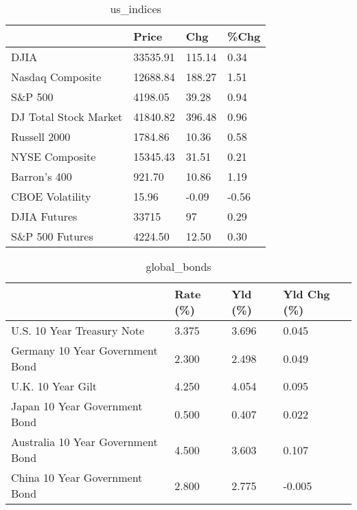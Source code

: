 \documentclass{article}%
\begin{document}
%


\begin{table}[htbp]%
\caption{us\_indices}%
\centering%
\begin{adjustbox}{width=1\textwidth}%
\begin{tabular}{llll}
\toprule
                      &    Price &    Chg &  \%Chg \\
\midrule
                 DJIA & 33535.91 & 115.14 &  0.34 \\
     Nasdaq Composite & 12688.84 & 188.27 &  1.51 \\
              S\&P 500 &  4198.05 &  39.28 &  0.94 \\
DJ Total Stock Market & 41840.82 & 396.48 &  0.96 \\
         Russell 2000 &  1784.86 &  10.36 &  0.58 \\
       NYSE Composite & 15345.43 &  31.51 &  0.21 \\
         Barron's 400 &   921.70 &  10.86 &  1.19 \\
      CBOE Volatility &    15.96 &  -0.09 & -0.56 \\
         DJIA Futures &    33715 &     97 &  0.29 \\
      S\&P 500 Futures &  4224.50 &  12.50 &  0.30 \\
\bottomrule
\end{tabular}
%
\end{adjustbox}%
\end{table}

%


\begin{table}[htbp]%
\caption{global\_bonds}%
\centering%
\begin{adjustbox}{width=1\textwidth}%
\begin{tabular}{llll}
\toprule
                                  & Rate (\%) & Yld (\%) & Yld Chg (\%) \\
\midrule
       U.S. 10 Year Treasury Note &    3.375 &   3.696 &       0.045 \\
  Germany 10 Year Government Bond &    2.300 &   2.498 &       0.049 \\
                U.K. 10 Year Gilt &    4.250 &   4.054 &       0.095 \\
    Japan 10 Year Government Bond &    0.500 &   0.407 &       0.022 \\
Australia 10 Year Government Bond &    4.500 &   3.603 &       0.107 \\
    China 10 Year Government Bond &    2.800 &   2.775 &      -0.005 \\
\bottomrule
\end{tabular}
%
\end{adjustbox}%
\end{table}
\end{document}
